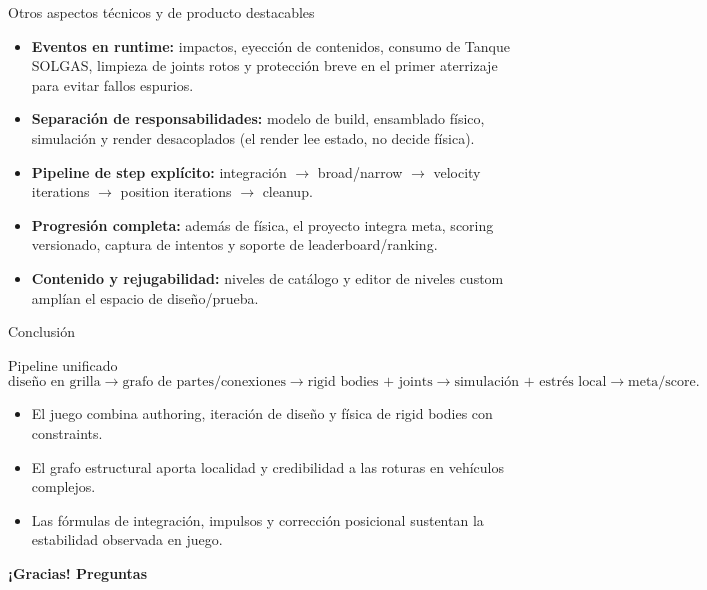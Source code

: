 \documentclass[aspectratio=169,11pt]{beamer}
\begin{document}
\begin{frame}{Otros aspectos técnicos y de producto destacables}
  \begin{itemize}
    \item \textbf{Eventos en runtime:} impactos, eyección de contenidos, consumo de Tanque SOLGAS, limpieza de joints rotos y protección breve en el primer aterrizaje para evitar fallos espurios.
    \item \textbf{Separación de responsabilidades:} modelo de build, ensamblado físico, simulación y render desacoplados (el render lee estado, no decide física).
    \item \textbf{Pipeline de step explícito:} integración $\rightarrow$ broad/narrow $\rightarrow$ velocity iterations $\rightarrow$ position iterations $\rightarrow$ cleanup.
    \item \textbf{Progresión completa:} además de física, el proyecto integra meta, scoring versionado, captura de intentos y soporte de leaderboard/ranking.
    \item \textbf{Contenido y rejugabilidad:} niveles de catálogo y editor de niveles custom amplían el espacio de diseño/prueba.
  \end{itemize}
\end{frame}

\begin{frame}{Conclusión}
  \begin{block}{Pipeline unificado}
    \[
      \text{diseño en grilla}
      \rightarrow \text{grafo de partes/conexiones}
      \rightarrow \text{rigid bodies + joints}
      \rightarrow \text{simulación + estrés local}
      \rightarrow \text{meta/score}.
    \]
  \end{block}

  \vspace{0.2cm}
  \begin{itemize}
    \item El juego combina authoring, iteración de diseño y física de rigid bodies con constraints.
    \item El grafo estructural aporta localidad y credibilidad a las roturas en vehículos complejos.
    \item Las fórmulas de integración, impulsos y corrección posicional sustentan la estabilidad observada en juego.
  \end{itemize}

  \vspace{0.25cm}
  \begin{center}
    \Large\textbf{¡Gracias! Preguntas}
  \end{center}
\end{frame}
\end{document}
